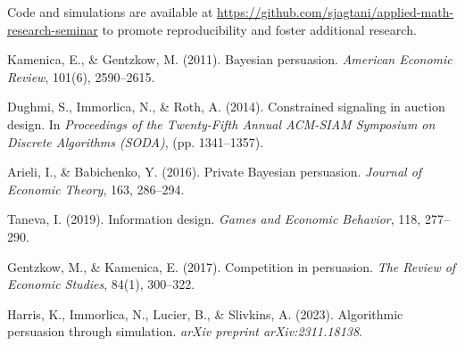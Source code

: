 \documentclass[12pt]{article}
\begin{document}
Code and simulations are available at \url{https://github.com/sjagtani/applied-math-research-seminar} to promote reproducibility and foster additional research.

\sloppy
\begin{thebibliography}{9}

Kamenica, E., \& Gentzkow, M. (2011).
\newblock Bayesian persuasion.
\newblock \textit{American Economic Review}, 101(6), 2590–2615.

Dughmi, S., Immorlica, N., \& Roth, A. (2014).
\newblock Constrained signaling in auction design.
\newblock In \textit{Proceedings of the Twenty-Fifth Annual ACM-SIAM Symposium on
Discrete Algorithms (SODA)}, (pp. 1341–1357).

Arieli, I., \& Babichenko, Y. (2016).
\newblock Private Bayesian persuasion.
\newblock \textit{Journal of Economic Theory}, 163, 286–294.

Taneva, I. (2019).
\newblock Information design.
\newblock \textit{Games and Economic Behavior}, 118, 277–290.

Gentzkow, M., \& Kamenica, E. (2017).
\newblock Competition in persuasion.
\newblock \textit{The Review of Economic Studies}, 84(1), 300–322.

Harris, K., Immorlica, N., Lucier, B., \& Slivkins, A. (2023).
\newblock Algorithmic persuasion through simulation.
\newblock \textit{arXiv preprint arXiv:2311.18138}.

\end{thebibliography}
\fussy
\end{document}
